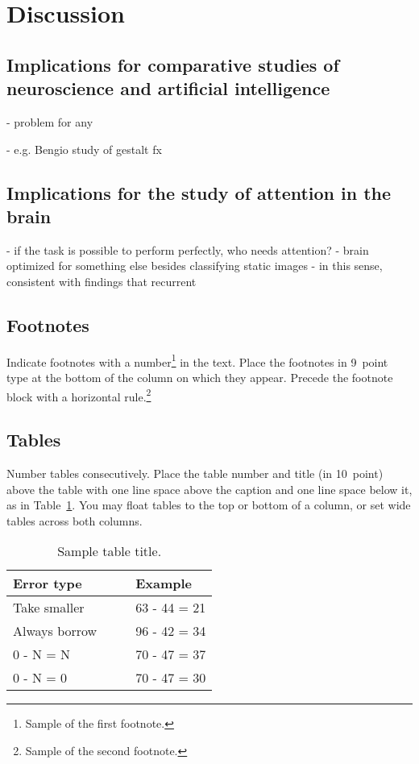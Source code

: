 \documentclass[10pt,letterpaper]{article}
\begin{document}
\section{Discussion}

\subsection{Implications for comparative studies of neuroscience and 
artificial intelligence}
- problem for any 

- e.g. Bengio study of gestalt fx

\subsection{Implications for the study of attention in the brain}
- if the task is possible to perform perfectly, who needs attention?
- brain optimized for something else besides classifying static images
- in this sense, consistent with findings that recurrent

\subsection{Footnotes}

Indicate footnotes with a number\footnote{Sample of the first
footnote.} in the text. Place the footnotes in 9~point type at the
bottom of the column on which they appear. Precede the footnote block
with a horizontal rule.\footnote{Sample of the second footnote.}


\subsection{Tables}

Number tables consecutively. Place the table number and title (in
10~point) above the table with one line space above the caption and
one line space below it, as in Table~\ref{sample-table}. You may float
tables to the top or bottom of a column, or set wide tables across
both columns.

\begin{table}[!ht]
\begin{center} 
\caption{Sample table title.} 
\label{sample-table} 
\vskip 0.12in
\begin{tabular}{ll} 
\hline
Error type    &  Example \\
\hline
Take smaller        &   63 - 44 = 21 \\
Always borrow~~~~   &   96 - 42 = 34 \\
0 - N = N           &   70 - 47 = 37 \\
0 - N = 0           &   70 - 47 = 30 \\
\hline
\end{tabular} 
\end{center} 
\end{table}
\end{document}
